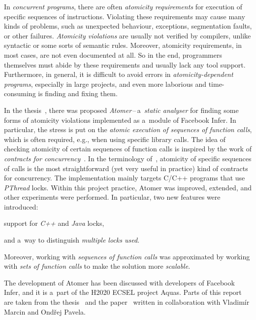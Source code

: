 In \emph{concurrent programs}, there are often \emph{atomicity requirements}
for execution of specific sequences of instructions. Violating these
requirements may cause many kinds of problems, such as unexpected behaviour,
exceptions, segmentation faults, or other failures. \emph{Atomicity violations}
are usually not verified by compilers, unlike syntactic or some sorts of
semantic rules. Moreover, atomicity requirements, in most cases, are not
even documented at all. So in the end, programmers themselves must abide by
these requirements and usually lack any tool support. Furthermore, in general,
it is difficult to avoid errors in \emph{atomicity-dependent programs},
especially in large projects, and even more laborious and time-consuming is
finding and fixing them.

In the thesis~\cite{harmimBP}, there was proposed
\emph{Atomer}\,--\,a~\emph{static analyser} for finding some forms of
atomicity violations implemented as a~module of Facebook Infer. In particular,
the stress is put on the \emph{atomic execution of sequences of function
calls}, which is often required, e.g., when using specific library calls.
The idea of checking atomicity of certain sequences of function calls is
inspired by the work of \emph{contracts for
concurrency}~\cite{contracts2017}. In the terminology of~\cite{contracts2017},
atomicity of specific sequences of calls is the most straightforward (yet
very useful in practice) kind of contracts for concurrency. The implementation
mainly targets C/C++ programs that use \emph{PThread} locks. Within this
project practice, Atomer was improved, extended, and other experiments were
performed. In particular, two new features were introduced:
\begin{enumerate*}[label={(\roman*)}]
    \item
        support for \emph{C++} and \emph{Java} locks,

    \item
        and a~way to distinguish \emph{multiple locks used}.
\end{enumerate*}
Moreover, working with \emph{sequences of function calls} was approximated
by working with \emph{sets of function calls} to make the solution more
\emph{scalable}.

The development of Atomer has been discussed with developers of Facebook
Infer, and it is a~part of the H2020 ECSEL project Aquas. Parts of this
report are taken from the thesis~\cite{harmimBP} and the
paper~\cite{excel2019FBInfer} written in collaboration with Vladimír Marcin
and Ondřej Pavela.

